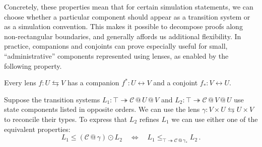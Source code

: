 \documentclass[acmsmall,screen,review,anonymous]{acmart}
\newcommand{\que}{\circ}
\newcommand{\ans}{\bullet}
\newcommand{\lensarrow}{\leftrightarrows}
\begin{document}
Concretely,
these properties mean that for certain simulation statements,
we can choose
whether a particular component
should appear as a transition system
or as a simulation convention.
This makes it possible to decompose proofs
along non-rectangular boundaries,
and generally affords us additional flexibility.
%
In practice,
companions and conjoints
can prove especially useful for small,
``administrative'' components
represented using lenses,
as enabled by the following property.

\begin{theorem}
Every lens $f : U \lensarrow V$
has a companion $f^* : U \leftrightarrow V$
and a conjoint $f_* : V \leftrightarrow U$.
\end{theorem}

\begin{example}
Suppose the transition systems
$L_1 : \top \twoheadrightarrow \mathcal{C} \mathbin@ U \mathbin@ V$ and
$L_2 : \top \twoheadrightarrow \mathcal{C} \mathbin@ V \mathbin@ U$
use state components listed in opposite orders.
We can use the lens
$\gamma : V \times U \lensarrow U \times V$
to reconcile their types.
To express that $L_2$ refines $L_1$ we can
use either one of the equivalent properties:
\[
  L_1
    \le
    (\mathcal{C} \mathbin@ \gamma) \odot L_2
  \quad \Leftrightarrow \quad
  L_1
    \le_{\top \twoheadrightarrow \mathcal{C} \mathbin@ \gamma_*}
    L_2
  \,.
\]
\end{example}

%
%
\end{document}
